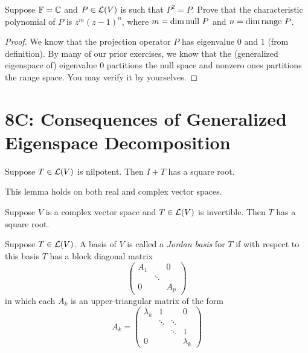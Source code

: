 \documentclass{extarticle}
\begin{document}
\begin{problem}{17}
    Suppose \(\mathbb{F} = \mathbb{C}\) and \(P \in \mathcal{L}(V)\) is such that \(P^2 = P\). Prove that the characteristic 
    polynomial of \(P\) is \(z^m (z-1)^n\), where \(m = \dim \text{null } P\) and \(n = \dim \text{range } P\).
\end{problem}

\begin{proof}
We know that the projection operator \(P\) has eigenvalue \(0\) and \(1\) (from definition). By many of 
our prior exercises, we know that the (generalized eigenspace of) eigenvalue 0 partitions the null space 
and nonzero ones partitions the range space. You may verify it by yourselves.
\end{proof}


\newpage 
\section*{8C: Consequences of Generalized Eigenspace Decomposition}

\begin{lemma}
    Suppose \(T \in \mathcal{L}(V)\) is nilpotent. Then \(I + T\) has a square root.
\end{lemma}

\begin{remark}
    This lemma holds on both real and complex vector spaces. 
\end{remark}

\begin{lemma}
    Suppose \(V\) is a complex vector space and \(T \in \mathcal{L}(V)\) is invertible. Then \(T\) has a square root.
\end{lemma}

\begin{definition}
    Suppose \(T \in \mathcal{L}(V)\). A basis of \(V\) is called a \emph{Jordan basis} for \(T\) if with respect 
    to this basis \(T\) has a block diagonal matrix 
    \[\begin{pmatrix}
        A_1 & & 0 \\ 
        & \ddots & \\ 
        0 & & A_p
    \end{pmatrix}\]
    in which each \(A_k\) is an upper-triangular matrix of the form 
    \[A_k = \begin{pmatrix}
        \lambda_k & 1 & & 0 \\ 
        & \ddots & \ddots & \\ 
        & & \ddots & 1  \\ 
        0 & & & \lambda_k 
    \end{pmatrix}\]
\end{definition}
\end{document}
